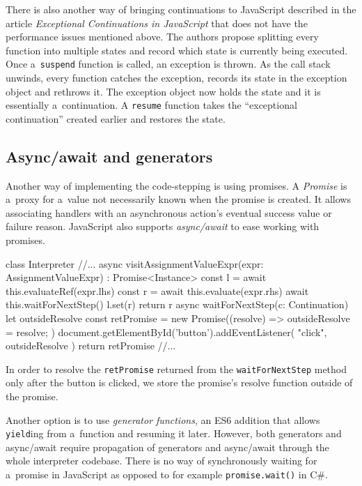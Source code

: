 There is also another way of bringing continuations to JavaScript described in the article \emph{Exceptional Continuations in JavaScript}
\cite{ExceptionalContinuations} that does not have the performance issues mentioned above. The authors propose splitting every function into
multiple states and record which state is currently being executed. Once a~\texttt{suspend} function is called, an exception is thrown. As
the call stack unwinds, every function catches the exception, records its state in the exception object and rethrows it. The exception object
now holds the state and it is essentially a~continuation. A \texttt{resume} function takes the ``exceptional continuation'' created earlier and restores the state.

\subsection*{Async/await and generators}
Another way of implementing the code-stepping is using promises. A \emph{Promise} is a~proxy for a~value not necessarily known when the promise is created.
It allows associating handlers with an asynchronous action's eventual success value or failure reason. JavaScript also supports \emph{async/await} to
ease working with promises.
\begin{code}
class Interpreter {
    //...
    async visitAssignmentValueExpr(expr: AssignmentValueExpr)
        : Promise<Instance> {
        const l = await this.evaluateRef(expr.lhs)
        const r = await this.evaluate(expr.rhs)
        await this.waitForNextStep()
        l.set(r)
        return r
    }
    async waitForNextStep(c: Continuation) {
        let outsideResolve
        const retPromise = new Promise((resolve) => { 
            outsideResolve = resolve; 
        })
        document.getElementById('button').addEventListener(
            "click",
            outsideResolve
        )
        return retPromise
    }
    //...
}
\end{code}
In order to resolve the \texttt{retPromise} returned from the \texttt{waitForNextStep} method only after the button is clicked, we store the promise's resolve
function outside of the promise.

Another option is to use \emph{generator functions}, an ES6 addition that allows \texttt{yield}ing from a~function and resuming it later. However, both generators
and async/await require propagation of generators and async/await through the whole interpreter codebase. There is no way of synchronously waiting for a~promise
in JavaScript as opposed to for example \texttt{promise.wait()} in C\#.
 
